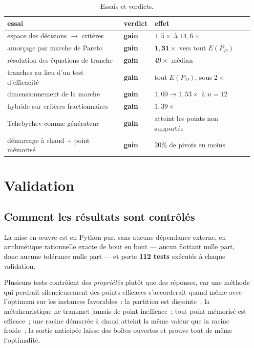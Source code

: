\documentclass[12pt,a4paper]{report}
\newcommand{\E}{E(P_D)}
\theoremstyle{plain}
\theoremstyle{definition}
\begin{document}
\begin{table}[h]
\centering
\caption{Essais et verdicts.}
\begin{tabular}{lll}
\toprule
essai & verdict & effet \\
\midrule
espace des décisions $\to$ critères & \textbf{gain} & $1{,}5\times$ à $14{,}6\times$ \\
amorçage par marche de Pareto & \textbf{gain} & $\mathbf{1{,}31\times}$ vers tout $\E$ \\
résolution des équations de tranche & \textbf{gain} & $49\times$ médian \\
tranches au lieu d'un test d'efficacité & \textbf{gain} & tout $\E$, sous $2\times$ \\
dimensionnement de la marche & \textbf{gain} & $1{,}00 \to 1{,}53\times$ à $n=12$ \\
hybride sur critères fractionnaires & \textbf{gain} & $1{,}39\times$ \\
Tchebychev comme générateur & \textbf{gain} & atteint les points non supportés \\
démarrage à chaud + point mémorisé & \textbf{gain} & $20\%$ de pivots en moins \\
\bottomrule
\end{tabular}
\end{table}


\chapter{Validation}
\label{ch:valid}

\section{Comment les résultats sont contrôlés}

La mise en {\oe}uvre est en Python pur, sans aucune dépendance externe, en
arithmétique rationnelle exacte de bout en bout --- aucun flottant nulle part,
donc aucune tolérance nulle part --- et porte \textbf{112 tests} exécutés à
chaque validation.

Plusieurs tests contrôlent des \emph{propriétés} plutôt que des réponses, car
une méthode qui perdrait silencieusement des points efficaces s'accorderait
quand même avec l'optimum sur les instances favorables~: la partition est
disjointe~; la métaheuristique ne transmet jamais de point inefficace~; tout
point mémorisé est efficace~; une racine démarrée à chaud atteint la même
valeur que la racine froide~; la sortie anticipée laisse des boîtes ouvertes et
prouve tout de même l'optimalité.
\end{document}

